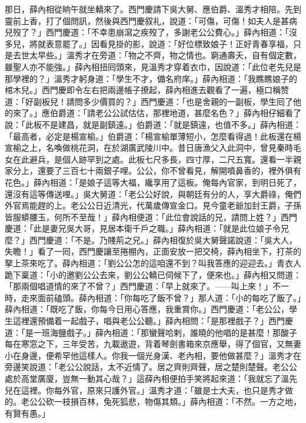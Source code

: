 那日，薛內相從晌午就坐轎來了。西門慶請下吳大舅、應伯爵、溫秀才相陪。先到靈前上香，打了個問訊，然後與西門慶叙礼，說道：「可傷，可傷！如夫人是甚病兒歿了？」{}西門慶道：「不幸患崩瀉之疾歿了，多謝老公公費心。」薛內相道：「沒多兒，將就表意罷了。」因看見掛的影，說道：「好位標致娘子！{}正好青春享福，只是去世太早些。」溫秀才在旁道：「物之不齊，物之情也。{}窮通壽夭，自有個定數，雖聖人亦不能強。」薛內相扭囘頭來，見溫秀才穿着衣巾，{}因說道：「此位老先兒是那學裡的？」溫秀才躬身道：「學生不才，備名府庠。」薛內相道：「我瞧瞧娘子的棺木兒。」{}西門慶即令左右把兩邊帳子撩起，薛內相進去觀看了一遍，極口稱赞道：「好副板兒！請問多少價買的？」西門慶道：「也是舍親的一副板，學生囘了他的來了。」應伯爵道：「請老公公試估估，那裡地道，甚麼名色？」薛內相仔細看了說：「此板不是建昌，就是副鎮遠。」伯爵道：「就是鎮遠，也值不多。」薛內相道：「最高者，必定是楊宣榆。」伯爵道：「楊宣榆單薄短小，怎麼看得過！此板還在楊宣榆之上，名喚做桃花洞，在於湖廣武陵川中。昔日唐漁父入此洞中，曾見秦時毛女在此避兵，是個人跡罕到之處。此板七尺多長，四寸厚，二尺五寬。還看一半親家分上，還要了三百七十兩銀子哩。公公，你不曾看見，解開噴鼻香的，裡外俱有花色。」薛內相道：「是娘子這等大福，纔享用了這板。俺每內官家，到明日死了，還沒有這等傳送哩。」吳大舅道：「老公公好說，與朝廷有分的人，享大爵祿，俺們外官焉能趕的上。老公公日近清光，代萬歲傳宣金口。見今童老爺加封王爵，子孫皆服蟒腰玉，何所不至哉！」薛內相便道：「此位會說話的兄，{}請問上姓？」西門慶道：「此是妻兄吳大哥，見居本衛千戶之職。」薛內相道：「就是此位娘子令兄麼？」{}西門慶道：「不是。乃賤荊之兄。」薛內相復於吳大舅聲諾說道：「吳大人，失瞻！」{}看了一囘，西門慶讓至捲棚內，正面安放一把交椅，薛內相坐下，打茶的拏上茶來吃了。薛內相道：「劉公公怎的這咱還不到？叫我答應的迎迎去。」青衣人跪下稟道：「小的邀劉公公去來，劉公公轎已伺候下了，便來也。」薛內相又問道：「那兩個唱道情的來了不曾？」西門慶道：「早上就來了。——叫上來！」不一時，走來面前磕頭。薛內相道：「你每吃了飯不曾？」那人道：「小的每吃了飯了。」薛內相道：「既吃了飯，你每今日用心答應，我重賞你。」西門慶道：「老公公，學生這裡還預備着一起戲子，唱與老公公聽。」薛內相問：「是那裡戲子？」西門慶道：「是一班海鹽戲子。」薛內相道：「那蠻聲哈剌，誰曉的他唱的是甚麼！那酸子每在寒窓之下，三年受苦，九載遨遊，背着琴劍書箱來京應舉，得了個官，又無妻小在身邊，便希罕他這樣人。你我一個光身漢、老內相，要他做甚麼？」溫秀才在旁邊笑說道：{}「老公公說話，太不近情了。居之齊則齊聲，居之楚則楚聲。老公公處於高堂廣廈，豈無一動其心哉？」這薛內相便拍手笑將起來道：「我就忘了溫先兒在這裡。你每外官，原來只護外官。」溫秀才道：「雖是士大夫，也只是秀才做的。老公公砍一枝損百林，兔死狐悲，物傷其類。」薛內相道：「不然。一方之地，有賢有愚。」

